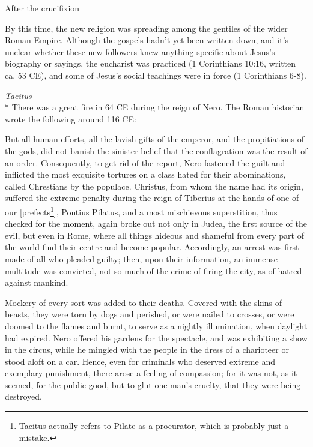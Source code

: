 \documentclass[10pt,twoside]{article} %
\newcommand{\doimage}[2]{\texttt{[image: \#2]}\label{fig:#2}}
\newcommand{\figbasic}[4]{ %
    \ifthenelse{\isodd{\pageref{fig:#2}}}{}{\hfill}
    \ifstrempty{#3}{
      \doimage{#1}{#2}
    }{
      \makebox{\doimage{#1}{#2} \\ #3}
    }
    \ifthenelse{\isodd{\pageref{fig:#2}}}{\hfill}{}
    \par
}
\newcommand{\fig}[2][0.4]{
  \figbasic{#1}{#2}{}{}
}
\newcommand{\quotesize}{\normalsize{}}
\newcommand{\comm}[1]{\begingroup \color{black!50} #1\endgroup}
\newenvironment{quotetext}{\begingroup\quotesize}{\endgroup}
\newcommand{\intex}[1]{\index[texts]{#1}}
\newcommand{\reftex}[1]{#1\intex{#1}}
\newcommand{\subhead}[1]{\emph{#1}\\*}
\begin{document}
\begin{section}{After the crucifixion}
\fig[0.6]{nero}

\comm{By this time, the new religion was  spreading among the gentiles of the wider Roman Empire.
Although the gospels hadn't yet been written down, and it's unclear whether
these new followers knew anything specific about Jesus's biography or sayings,
the eucharist was practiced (\reftex{1 Corinthians 10:16}, written ca. 53 CE),
and some of Jesus's social teachings were in force (\reftex{1 Corinthians 6-8}).
}


\subhead{Tacitus}\label{tacitus}%
\comm{There was a great fire in 64 CE during the reign of Nero. The Roman historian wrote the following around 116 CE:}

\begin{quotetext}
But all human efforts, all the lavish gifts of the emperor, and the
propitiations of the gods, did not banish the sinister belief that the
conflagration was the result of an order. Consequently, to get rid of
the report, Nero fastened the guilt and inflicted the most exquisite
tortures on a class hated for their abominations, called Chrestians by
the populace. Christus, from whom the name had its origin, suffered
the extreme penalty during the reign of Tiberius at the hands of one
of our [prefects\footnote{Tacitus actually refers to Pilate as a procurator, which is probably just a mistake.}], Pontius Pilatus, and a most mischievous
superstition, thus checked for the moment, again broke out not only in
Judea, the first source of the evil, but even in Rome, where all
things hideous and shameful from every part of the world find their
centre and become popular. Accordingly, an arrest was first made of
all who pleaded guilty; then, upon their information, an immense
multitude was convicted, not so much of the crime of firing the city,
as of hatred against mankind.
\end{quotetext}

\begin{quotetext}
Mockery of every sort was added to their deaths. Covered with the
skins of beasts, they were torn by dogs and perished, or were nailed
to crosses, or were doomed to the flames and burnt, to serve as a
nightly illumination, when daylight had expired. Nero offered his
gardens for the spectacle, and was exhibiting a show in the circus,
while he mingled with the people in the dress of a charioteer or stood
aloft on a car. Hence, even for criminals who deserved extreme and
exemplary punishment, there arose a feeling of compassion; for it was
not, as it seemed, for the public good, but to glut one man's cruelty,
that they were being destroyed.
\end{quotetext}


\end{section}
\end{document}
